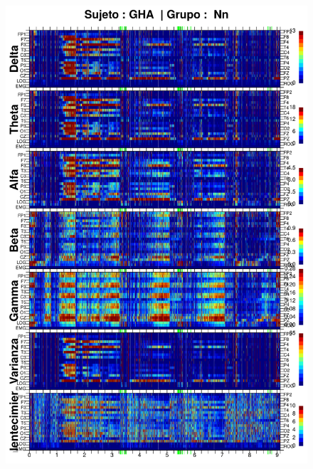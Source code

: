 \begin{figure}
\centering
\includegraphics[width=0.9\linewidth]
{./enlentecimiento/GH24031950SUENO_espectral_total.png} 
\end{figure}
